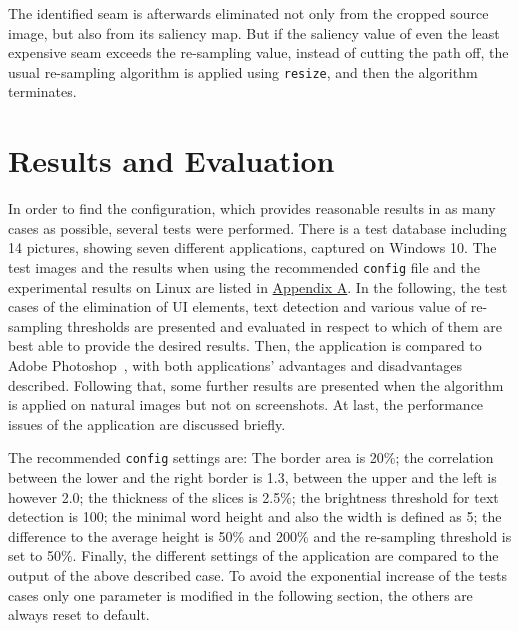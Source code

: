 \documentclass[draft,final]{vutinfth} %
\begin{document}
	The identified seam is afterwards eliminated not only from the cropped source image, but also from its saliency map.
	But if the saliency value of even the least expensive seam exceeds the re-sampling value, instead of cutting the path off, the usual re-sampling algorithm is applied using \texttt{resize}, and then the algorithm terminates. 
	
	\chapter{Results and Evaluation}
	In order to find the configuration, which provides reasonable results in as many cases as possible, several tests were performed.
	There is a test database including 14 pictures, showing seven different applications, captured on Windows 10.
	The test images and the results when using the recommended \texttt{config} file and the experimental results on Linux are listed in \hyperref[AppA]{Appendix A}. 
	In the following, the test cases of the elimination of UI elements, text detection and various value of re-sampling thresholds are presented and evaluated in respect to which of them are best able to provide the desired results.
	Then, the application is compared to Adobe Photoshop~\cite{photoshop}, with both applications' advantages and disadvantages described.
	Following that, some further results are presented when the algorithm is applied on natural images but not on screenshots.
	At last, the performance issues of the application are discussed briefly.\par 
	The recommended \texttt{config} settings are:
	The border area is 20\%; the correlation between the lower and the right border is 1.3, between the upper and the left is however 2.0; the thickness of the slices is 2.5\%; the brightness threshold for text detection is 100; the minimal word height and also the width is defined as 5; the difference to the average height is 50\% and 200\% and the re-sampling threshold is set to 50\%.
	Finally, the different settings of the application are compared to the output of the above described case.
	To avoid the exponential increase of the tests cases only one parameter is modified in the following section, the others are always reset to default. 
\end{document}
